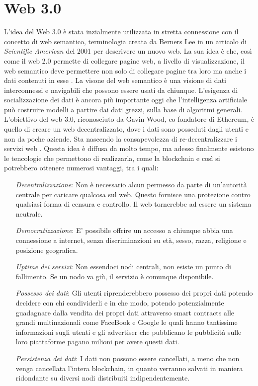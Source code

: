 \section{Web 3.0}
L'idea del Web 3.0 è stata inzialmente utilizzata in stretta connessione con il concetto di web semantico, terminologia creata da Berners Lee in un articolo di \textit{Scientific American} del 2001 per descrivere un nuovo web. 
La sua idea è che, così come il web 2.0 permette di collegare pagine web, a livello di visualizzazione, il web semantico deve permettere non solo di collegare pagine tra loro ma anche i dati contenuti in esse \cite{ted_youtube}.
La visone del web semantico è una visione di dati interconnessi e navigabili che possono essere usati da chiunque. L'esigenza di socializzazione dei dati è ancora più importante oggi che l'intelligenza artificiale può costruire modelli a partire dai dati grezzi, sulla base di algoritmi generali.
\\L'obiettivo del web 3.0, riconosciuto da Gavin Wood, co fondatore di Ethereum, è quello di creare un web decentralizzato, dove i dati sono posseduti dagli utenti e non da poche aziende. Sta nascendo la consapevolezza di re-decentralizzare i servizi web \cite{Blockchain_tecnologia_e_applicazioni_per_il_business}.
Questa idea è diffusa da molto tempo, ma adesso finalmente esistono le tencologie che permettono di realizzarla, come la blockchain 
e così si potrebbero ottenere numerosi vantaggi, tra i quali:
\begin{itemize}
    \item [\textit{Decentralizzazione}:] Non è necessario alcun permesso da parte di un'autorità centrale per caricare qualcosa sul web. Questo fornisce una protezione contro qualsiasi forma di censura e controllo. Il web tornerebbe ad essere un sistema neutrale.
    \item [\textit{Democratizzazione}:] E' possibile offrire un accesso a chiunque abbia una connessione a internet, senza discriminazioni su età, sesso, razza, religione e posizione geografica.
    \item [\textit{Uptime dei servizi}:] Non essendoci nodi centrali, non esiste un punto di fallimento. Se un nodo va giù, il servizio è comunque disponibile.
    \item [\textit{Possesso dei dati}:] Gli utenti riprenderebbero possesso dei propri dati potendo decidere con chi condividerli e in che modo, potendo potenzialmente guadagnare dalla vendita dei propri dati attraverso smart contracts alle grandi multinazionali come FaceBook e Google le quali hanno tantissime informazioni sugli utenti e gli advertiser che pubblicano le pubblicità sulle loro piattaforme pagano milioni per avere questi dati.
    \item [\textit{Persistenza dei dati}:] I dati non possono essere cancellati, a meno che non venga cancellata l'intera blockchain, in quanto verranno salvati in maniera ridondante su diversi nodi distribuiti indipendentemente.
\end{itemize}
